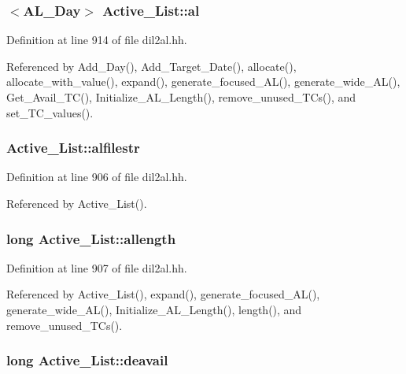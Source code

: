 \subsubsection{$<${\bf AL\_\-Day}$>$ Active\_\-List::al}\label{classActive__List_m0}




Definition at line 914 of file dil2al.hh.

Referenced by Add\_\-Day(), Add\_\-Target\_\-Date(), allocate(), allocate\_\-with\_\-value(), expand(), generate\_\-focused\_\-AL(), generate\_\-wide\_\-AL(), Get\_\-Avail\_\-TC(), Initialize\_\-AL\_\-Length(), remove\_\-unused\_\-TCs(), and set\_\-TC\_\-values().
\subsubsection{ Active\_\-List::alfilestr\hspace{0.3cm}{\tt  [protected]}}\label{classActive__List_n2}




Definition at line 906 of file dil2al.hh.

Referenced by Active\_\-List().
\subsubsection{\setlength{\rightskip}{0pt plus 5cm}long Active\_\-List::allength\hspace{0.3cm}{\tt  [protected]}}\label{classActive__List_n3}




Definition at line 907 of file dil2al.hh.

Referenced by Active\_\-List(), expand(), generate\_\-focused\_\-AL(), generate\_\-wide\_\-AL(), Initialize\_\-AL\_\-Length(), length(), and remove\_\-unused\_\-TCs().
\subsubsection{\setlength{\rightskip}{0pt plus 5cm}long Active\_\-List::deavail}\label{classActive__List_m2}




